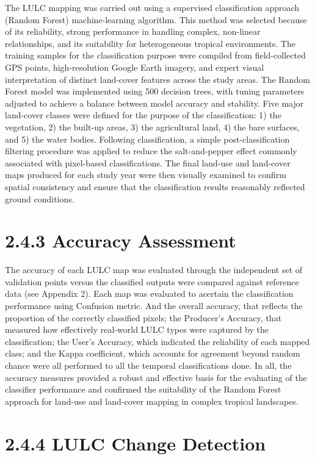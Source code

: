 The LULC mapping was carried out using a supervised classification approach (Random Forest) machine-learning algorithm. This method was selected because of its reliability, strong performance in handling complex, non-linear relationships, and its suitability for heterogeneous tropical environments. The training samples for the classification purpose were compiled from field-collected GPS points, high-resolution Google Earth imagery, and expert visual interpretation of distinct land-cover features across the study areas.
The Random Forest model was implemented using 500 decision trees, with tuning parameters adjusted to achieve a balance between model accuracy and stability. Five major land-cover classes were defined for the purpose of the classification: 1) the vegetation, 2) the built-up areas, 3) the agricultural land, 4) the bare surfaces, and 5) the water bodies. Following classification, a simple post-classification filtering procedure was applied to reduce the salt-and-pepper effect commonly associated with pixel-based classifications. The final land-use and land-cover maps produced for each study year were then visually examined to confirm spatial consistency and ensure that the classification results reasonably reflected ground conditions.
\hypertarget{accuracy-assessment}{%
\section{\texorpdfstring{\textbf{2.4.3 Accuracy Assessment}}{2.4.3 Accuracy Assessment}}\label{accuracy-assessment}}

The accuracy of each LULC map was evaluated through the independent set of validation points versus the classified outputs were compared against reference data (see Appendix 2). Each map was evaluated to acertain the classification performance using Confusion metric. And the overall accuracy, that reflects the proportion of the correctly classified pixels; the Producer's Accuracy, that measured how effectively real-world LULC types were captured by the classification; the User's Accuracy, which indicated the reliability of each mapped class; and the Kappa coefficient, which accounts for agreement beyond random chance were all performed to all the temporal classifications done.
In all, the accuracy measures provided a robust and effective basis for the evaluating of the classifier performance and confirmed the suitability of the Random Forest approach for land-use and land-cover mapping in complex tropical landscapes.
\hypertarget{lulc-change-detection}{%
\section{\texorpdfstring{\textbf{2.4.4 LULC Change Detection}}{2.4.4 LULC Change Detection}}\label{lulc-change-detection}}

